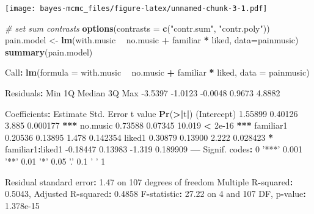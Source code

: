 \documentclass[]{article}
\newenvironment{Shaded}{\begin{snugshade}}{\end{snugshade}}
\newcommand{\CommentTok}[1]{\textcolor[rgb]{0.56,0.35,0.01}{\textit{#1}}}
\newcommand{\DataTypeTok}[1]{\textcolor[rgb]{0.13,0.29,0.53}{#1}}
\newcommand{\DecValTok}[1]{\textcolor[rgb]{0.00,0.00,0.81}{#1}}
\newcommand{\ErrorTok}[1]{\textcolor[rgb]{0.64,0.00,0.00}{\textbf{#1}}}
\newcommand{\FloatTok}[1]{\textcolor[rgb]{0.00,0.00,0.81}{#1}}
\newcommand{\KeywordTok}[1]{\textcolor[rgb]{0.13,0.29,0.53}{\textbf{#1}}}
\newcommand{\NormalTok}[1]{#1}
\newcommand{\OperatorTok}[1]{\textcolor[rgb]{0.81,0.36,0.00}{\textbf{#1}}}
\newcommand{\StringTok}[1]{\textcolor[rgb]{0.31,0.60,0.02}{#1}}
\begin{document}
\texttt{[image: bayes-mcmc\_files/figure-latex/unnamed-chunk-3-1.pdf]}

\begin{Shaded}
\begin{Highlighting}[]
\CommentTok{# set sum contrasts}
\KeywordTok{options}\NormalTok{(}\DataTypeTok{contrasts =} \KeywordTok{c}\NormalTok{(}\StringTok{"contr.sum"}\NormalTok{, }\StringTok{"contr.poly"}\NormalTok{))}
\NormalTok{pain.model <-}\StringTok{ }\KeywordTok{lm}\NormalTok{(with.music }\OperatorTok{~}
\StringTok{                   }\NormalTok{no.music }\OperatorTok{+}\StringTok{ }\NormalTok{familiar }\OperatorTok{*}\StringTok{ }\NormalTok{liked,}
                 \DataTypeTok{data=}\NormalTok{painmusic)}
\KeywordTok{summary}\NormalTok{(pain.model)}

\NormalTok{Call}\OperatorTok{:}
\KeywordTok{lm}\NormalTok{(}\DataTypeTok{formula =}\NormalTok{ with.music }\OperatorTok{~}\StringTok{ }\NormalTok{no.music }\OperatorTok{+}\StringTok{ }\NormalTok{familiar }\OperatorTok{*}\StringTok{ }\NormalTok{liked, }\DataTypeTok{data =}\NormalTok{ painmusic)}

\NormalTok{Residuals}\OperatorTok{:}
\StringTok{    }\NormalTok{Min      1Q  Median      3Q     Max }
\FloatTok{-3.5397} \FloatTok{-1.0123} \FloatTok{-0.0048}  \FloatTok{0.9673}  \FloatTok{4.8882} 

\NormalTok{Coefficients}\OperatorTok{:}
\StringTok{                 }\NormalTok{Estimate Std. Error t value }\KeywordTok{Pr}\NormalTok{(}\OperatorTok{>}\ErrorTok{|}\NormalTok{t}\OperatorTok{|}\NormalTok{)    }
\NormalTok{(Intercept)       }\FloatTok{1.55899}    \FloatTok{0.40126}   \FloatTok{3.885} \FloatTok{0.000177} \OperatorTok{**}\ErrorTok{*}
\NormalTok{no.music          }\FloatTok{0.73588}    \FloatTok{0.07345}  \FloatTok{10.019}  \OperatorTok{<}\StringTok{ }\FloatTok{2e-16} \OperatorTok{**}\ErrorTok{*}
\NormalTok{familiar1         }\FloatTok{0.20536}    \FloatTok{0.13895}   \FloatTok{1.478} \FloatTok{0.142354}    
\NormalTok{liked1            }\FloatTok{0.30879}    \FloatTok{0.13900}   \FloatTok{2.222} \FloatTok{0.028423} \OperatorTok{*}\StringTok{  }
\NormalTok{familiar1}\OperatorTok{:}\NormalTok{liked1 }\FloatTok{-0.18447}    \FloatTok{0.13983}  \FloatTok{-1.319} \FloatTok{0.189909}    
\OperatorTok{---}
\NormalTok{Signif. codes}\OperatorTok{:}\StringTok{  }\DecValTok{0} \StringTok{'***'} \FloatTok{0.001} \StringTok{'**'} \FloatTok{0.01} \StringTok{'*'} \FloatTok{0.05} \StringTok{'.'} \FloatTok{0.1} \StringTok{' '} \DecValTok{1}

\NormalTok{Residual standard error}\OperatorTok{:}\StringTok{ }\FloatTok{1.47}\NormalTok{ on }\DecValTok{107}\NormalTok{ degrees of freedom}
\NormalTok{Multiple R}\OperatorTok{-}\NormalTok{squared}\OperatorTok{:}\StringTok{  }\FloatTok{0.5043}\NormalTok{,    Adjusted R}\OperatorTok{-}\NormalTok{squared}\OperatorTok{:}\StringTok{  }\FloatTok{0.4858} 
\NormalTok{F}\OperatorTok{-}\NormalTok{statistic}\OperatorTok{:}\StringTok{ }\FloatTok{27.22}\NormalTok{ on }\DecValTok{4}\NormalTok{ and }\DecValTok{107}\NormalTok{ DF,  p}\OperatorTok{-}\NormalTok{value}\OperatorTok{:}\StringTok{ }\FloatTok{1.378e-15}
\end{Highlighting}
\end{Shaded}
\end{document}
